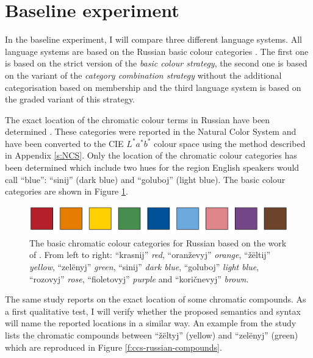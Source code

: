 \section{Baseline experiment}

In the baseline experiment, I will compare three different language
systems. All language systems are based on the Russian basic colour
categories \citep{safuanova07russian}. The first one is based on the
strict version of the \emph{basic colour strategy}, the second one is
based on the variant of the \emph{category combination strategy}
without the additional categorisation based on membership and the
third language system is based on the graded variant of this strategy.

The exact location of the chromatic colour terms in Russian have been
determined \citep{safuanova07russian}. These categories were reported
in the Natural Color System and have been converted to the CIE
$L^*a^*b^*$ colour space using the method described in Appendix
\ref{s:NCS}. Only the location of the chromatic colour categories has
been determined which include two hues for the region English speakers
would call ``blue'': ``sinij'' (dark blue) and ``goluboj'' (light
blue). The basic colour categories are shown in Figure
\ref{f:ccs-russian-basic}.

\begin{figure}[htpb]
  \centering
  \includegraphics[width=.9\textwidth]{./category-combination/figures/russian-basic-categories.pdf}
  \caption[The basic chromatic colour categories for Russian]{The
    basic chromatic colour categories for Russian based on the work of
    \citeauthor{safuanova07russian}. From left to right: ``krasnij''
    \emph{red}, ``oran\v zevyj'' \emph{orange}, ``\v z\"eltij'' \emph{yellow}, ``zel\"enyj''
    \emph{green}, ``sinij'' \emph{dark blue}, ``goluboj'' \emph{light blue},
    ``rozovyj'' \emph{rose}, ``fioletovyj'' \emph{purple} and ``kori\v cnevyj''
    \emph{brown}.}
  \label{f:ccs-russian-basic}
\end{figure}

The same study reports on the exact location of some chromatic
compounds. As a first qualitative test, I will verify whether the
proposed semantics and syntax will name the reported locations in a
similar way. An example from the study lists the chromatic compounds
between ``\v z\"eltyj'' (yellow) and ``zel\"enyj'' (green) which are
reproduced in Figure \ref{f:ccs-russian-compounds}.

